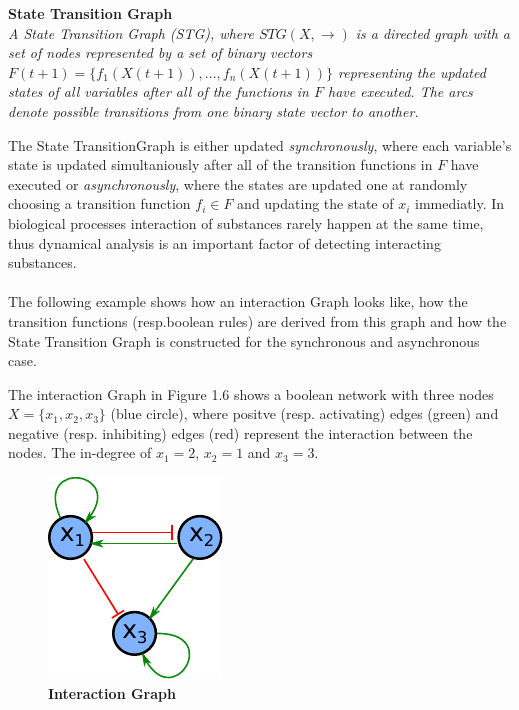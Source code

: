 \begin{defn}\textbf{State Transition Graph}\\
\textit{A State Transition Graph (\gls{STG}), where $STG(X,\rightarrow )$ is a directed graph with a set of nodes represented by a set of binary vectors $F(t+1)=\{ f_{1}(X(t+1)),...,f_{n}(X(t+1))\} $ representing the updated states of all variables after all of the functions in $F$ have executed. The arcs denote possible transitions from one binary state vector to another. }
\end{defn}%
The State TransitionGraph is either updated \textit{synchronously}, where each variable's state is updated simultaniously after all of the transition functions in $F$ have executed or \textit{asynchronously}, where the states are updated one at randomly choosing a transition function $f_{i}\in F$ and updating the state of $x_{i}$ immediatly. In biological processes interaction of substances rarely happen at the same time, thus dynamical analysis is an important factor of detecting interacting substances.
\\\\
The following example shows how an interaction Graph looks like, how the transition functions (resp.boolean rules) are derived from this graph and how the State Transition Graph is constructed for the synchronous and asynchronous case.

\begin{exmp}
The interaction Graph in Figure 1.6 shows a boolean network with three nodes $X=\{x_{1},x_{2},x_{3}\}$ (blue circle), where positve (resp. activating) edges (green) and negative (resp. inhibiting) edges (red) represent the interaction between the nodes. The in-degree of $x_{1}=2$, $x_{2}=1$ and $x_{3}=3$.
\end{exmp}
 

\begin{figure}[H]
\centering
\includegraphics[scale=1.2]{./Bilder/examplenetwork.pdf}
\caption[Interaction Graph]{\textbf{Interaction Graph}}
\label{fig:7}
\end{figure}




